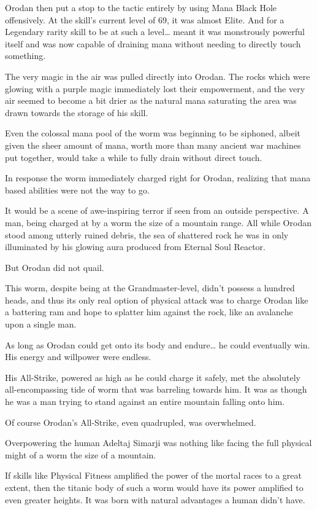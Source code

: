 \documentclass[a4paper,10pt]{book}
\begin{document}
Orodan then put a stop to the tactic entirely by using Mana Black Hole offensively. At the skill’s current level of 69, it was almost Elite. And for a Legendary rarity skill to be at such a level… meant it was monstrously powerful itself and was now capable of draining mana without needing to directly touch something.\par
The very magic in the air was pulled directly into Orodan. The rocks which were glowing with a purple magic immediately lost their empowerment, and the very air seemed to become a bit drier as the natural mana saturating the area was drawn towards the storage of his skill.\par
Even the colossal mana pool of the worm was beginning to be siphoned, albeit given the sheer amount of mana, worth more than many ancient war machines put together, would take a while to fully drain without direct touch.\par
In response the worm immediately charged right for Orodan, realizing that mana based abilities were not the way to go.\par
It would be a scene of awe-inspiring terror if seen from an outside perspective. A man, being charged at by a worm the size of a mountain range. All while Orodan stood among utterly ruined debris, the sea of shattered rock he was in only illuminated by his glowing aura produced from Eternal Soul Reactor.\par
But Orodan did not quail.\par
This worm, despite being at the Grandmaster-level, didn’t possess a hundred heads, and thus its only real option of physical attack was to charge Orodan like a battering ram and hope to splatter him against the rock, like an avalanche upon a single man.\par
As long as Orodan could get onto its body and endure… he could eventually win. His energy and willpower were endless.\par
His All-Strike, powered as high as he could charge it safely, met the absolutely all-encompassing tide of worm that was barreling towards him. It was as though he was a man trying to stand against an entire mountain falling onto him.\par
Of course Orodan’s All-Strike, even quadrupled, was overwhelmed.\par
Overpowering the human Adeltaj Simarji was nothing like facing the full physical might of a worm the size of a mountain.\par
If skills like Physical Fitness amplified the power of the mortal races to a great extent, then the titanic body of such a worm would have its power amplified to even greater heights. It was born with natural advantages a human didn’t have.\par
\end{document}
